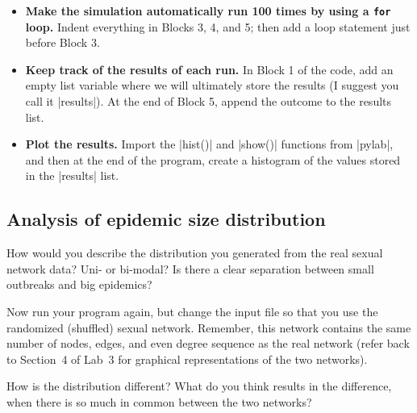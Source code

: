 \documentclass{article}
\begin{document}
\begin{itemize}
\item \textbf{Make the simulation automatically run 100 times by using a \texttt{for} loop.}  Indent everything in Blocks 3, 4, and 5; then add
a loop statement just before Block 3.
\item \textbf{Keep track of the results of each run.}  In Block 1 of the code, add an empty list variable where we will ultimately store the results (I suggest you call it |results|).  
At the end of Block 5, append the outcome to the results list.
\item \textbf{Plot the results.}  Import the |hist()| and |show()| functions from |pylab|, and then at 
the end of the program, create a histogram of the values stored in the |results| list.
\end{itemize}

\subsection{Analysis of epidemic size distribution}
How would you describe the distribution you generated from the real sexual network data?  Uni- or bi-modal? Is there a clear
separation between small outbreaks and big epidemics?

Now run your program again, but change the input file so that you use the randomized (shuffled) sexual network.  Remember, this network contains the
same number of nodes, edges, and even degree sequence as the real network (refer back to Section~4 of Lab~3 for graphical representations of the two networks).

How is the distribution different?  What do you think results in the difference, when there is so much in common between the two networks?
\end{document}

